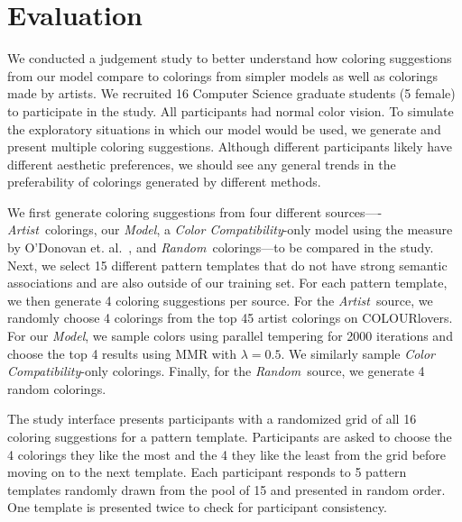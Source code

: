 \section{Evaluation}
\label{sec:evaluation}

We conducted a judgement study to better understand how coloring suggestions from our model compare to colorings from simpler models as well as colorings made by artists. We recruited 16 Computer Science graduate students (5 female) to participate in the study. All participants had normal color vision. To simulate the exploratory situations in which our model would be used, we generate and present multiple coloring suggestions. Although different participants likely have different aesthetic preferences, we should see any general trends in the preferability of colorings generated by different methods. 

\newcommand{\artistSource}{\emph{Artist}}
\newcommand{\modelSource}{\emph{Model}}
\newcommand{\compatSource}{\emph{Color Compatibility}}
\newcommand{\randomSource}{\emph{Random}}
We first generate coloring suggestions from four different sources----\artistSource~colorings, our \modelSource, a \compatSource-only model using the measure by O'Donovan et. al.~, and \randomSource~colorings---to be compared in the study. Next, we select 15 different pattern templates that do not have strong semantic associations and are also outside of our training set. For each pattern template, we then generate 4 coloring suggestions per source. For the \artistSource~source, we randomly choose 4 colorings from the top 45 artist colorings on COLOURlovers. For our \modelSource, we sample colors using parallel tempering for 2000 iterations and choose the top 4 results using MMR with $\lambda = 0.5$. We similarly sample \compatSource-only colorings. Finally, for the \randomSource~source, we generate 4 random colorings.

The study interface presents participants with a randomized grid of all 16 coloring suggestions for a pattern template. Participants are asked to choose the 4 colorings they like the most and the 4 they like the least from the grid before moving on to the next template. Each participant responds to 5 pattern templates randomly drawn from the pool of 15 and presented in random order. One template is presented twice to check for participant consistency.

